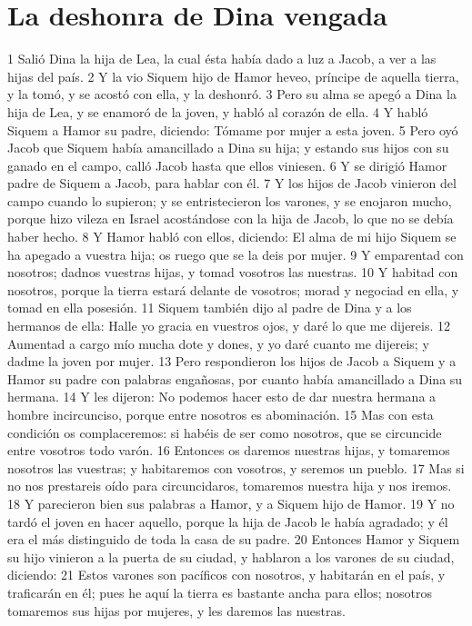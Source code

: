 \section{La deshonra de Dina vengada}

1 Salió Dina la hija de Lea, la cual ésta había dado a luz a Jacob, a ver a las hijas del país.
2 Y la vio Siquem hijo de Hamor heveo, príncipe de aquella tierra, y la tomó, y se acostó con ella, y la deshonró.
3 Pero su alma se apegó a Dina la hija de Lea, y se enamoró de la joven, y habló al corazón de ella.
4 Y habló Siquem a Hamor su padre, diciendo: Tómame por mujer a esta joven.
5 Pero oyó Jacob que Siquem había amancillado a Dina su hija; y estando sus hijos con su ganado en el campo, calló Jacob hasta que ellos viniesen.
6 Y se dirigió Hamor padre de Siquem a Jacob, para hablar con él.
7 Y los hijos de Jacob vinieron del campo cuando lo supieron; y se entristecieron los varones, y se enojaron mucho, porque hizo vileza en Israel acostándose con la hija de Jacob, lo que no se debía haber hecho.
8 Y Hamor habló con ellos, diciendo: El alma de mi hijo Siquem se ha apegado a vuestra hija; os ruego que se la deis por mujer.
9 Y emparentad con nosotros; dadnos vuestras hijas, y tomad vosotros las nuestras.
10 Y habitad con nosotros, porque la tierra estará delante de vosotros; morad y negociad en ella, y tomad en ella posesión.
11 Siquem también dijo al padre de Dina y a los hermanos de ella: Halle yo gracia en vuestros ojos, y daré lo que me dijereis.
12 Aumentad a cargo mío mucha dote y dones, y yo daré cuanto me dijereis; y dadme la joven por mujer.
13 Pero respondieron los hijos de Jacob a Siquem y a Hamor su padre con palabras engañosas, por cuanto había amancillado a Dina su hermana.
14 Y les dijeron: No podemos hacer esto de dar nuestra hermana a hombre incircunciso, porque entre nosotros es abominación.
15 Mas con esta condición os complaceremos: si habéis de ser como nosotros, que se circuncide entre vosotros todo varón.
16 Entonces os daremos nuestras hijas, y tomaremos nosotros las vuestras; y habitaremos con vosotros, y seremos un pueblo.
17 Mas si no nos prestareis oído para circuncidaros, tomaremos nuestra hija y nos iremos.
18 Y parecieron bien sus palabras a Hamor, y a Siquem hijo de Hamor.
19 Y no tardó el joven en hacer aquello, porque la hija de Jacob le había agradado; y él era el más distinguido de toda la casa de su padre.
20 Entonces Hamor y Siquem su hijo vinieron a la puerta de su ciudad, y hablaron a los varones de su ciudad, diciendo:
21 Estos varones son pacíficos con nosotros, y habitarán en el país, y traficarán en él; pues he aquí la tierra es bastante ancha para ellos; nosotros tomaremos sus hijas por mujeres, y les daremos las nuestras.
